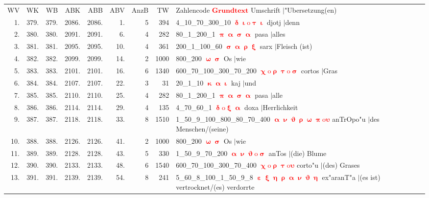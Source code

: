 \documentclass[a4paper,10pt,landscape]{article}
\begin{document}
\begin{tabular}{rrrrrrrrp{120mm}}
WV&WK&WB&ABK&ABB&ABV&AnzB&TW&Zahlencode \textcolor{red}{$\boldsymbol{Grundtext}$} Umschrift $|$"Ubersetzung(en)\\
1.&379.&379.&2086.&2086.&1.&5&394&4\_10\_70\_300\_10 \textcolor{red}{$\boldsymbol{\updelta\upiota\mathrm{o}\uptau\upiota}$} djotj $|$denn\\
2.&380.&380.&2091.&2091.&6.&4&282&80\_1\_200\_1 \textcolor{red}{$\boldsymbol{\uppi\upalpha\upsigma\upalpha}$} pasa $|$alles\\
3.&381.&381.&2095.&2095.&10.&4&361&200\_1\_100\_60 \textcolor{red}{$\boldsymbol{\upsigma\upalpha\uprho\upxi}$} sarx $|$Fleisch (ist)\\
4.&382.&382.&2099.&2099.&14.&2&1000&800\_200 \textcolor{red}{$\boldsymbol{\upomega\upsigma}$} Os $|$wie\\
5.&383.&383.&2101.&2101.&16.&6&1340&600\_70\_100\_300\_70\_200 \textcolor{red}{$\boldsymbol{\upchi\mathrm{o}\uprho\uptau\mathrm{o}\upsigma}$} cortos $|$Gras\\
6.&384.&384.&2107.&2107.&22.&3&31&20\_1\_10 \textcolor{red}{$\boldsymbol{\upkappa\upalpha\upiota}$} kaj $|$und\\
7.&385.&385.&2110.&2110.&25.&4&282&80\_1\_200\_1 \textcolor{red}{$\boldsymbol{\uppi\upalpha\upsigma\upalpha}$} pasa $|$alle\\
8.&386.&386.&2114.&2114.&29.&4&135&4\_70\_60\_1 \textcolor{red}{$\boldsymbol{\updelta\mathrm{o}\upxi\upalpha}$} doxa $|$Herrlichkeit\\
9.&387.&387.&2118.&2118.&33.&8&1510&1\_50\_9\_100\_800\_80\_70\_400 \textcolor{red}{$\boldsymbol{\upalpha\upnu\upvartheta\uprho\upomega\uppi\mathrm{o}\upsilon}$} anTrOpo"u $|$des Menschen/(seine)\\
10.&388.&388.&2126.&2126.&41.&2&1000&800\_200 \textcolor{red}{$\boldsymbol{\upomega\upsigma}$} Os $|$wie\\
11.&389.&389.&2128.&2128.&43.&5&330&1\_50\_9\_70\_200 \textcolor{red}{$\boldsymbol{\upalpha\upnu\upvartheta\mathrm{o}\upsigma}$} anTos $|$(die) Blume\\
12.&390.&390.&2133.&2133.&48.&6&1540&600\_70\_100\_300\_70\_400 \textcolor{red}{$\boldsymbol{\upchi\mathrm{o}\uprho\uptau\mathrm{o}\upsilon}$} corto"u $|$(des) Grases\\
13.&391.&391.&2139.&2139.&54.&8&241&5\_60\_8\_100\_1\_50\_9\_8 \textcolor{red}{$\boldsymbol{\upepsilon\upxi\upeta\uprho\upalpha\upnu\upvartheta\upeta}$} ex"aranT"a $|$(es ist) vertrocknet/(es) verdorrte\\

\end{tabular}
\end{document}

